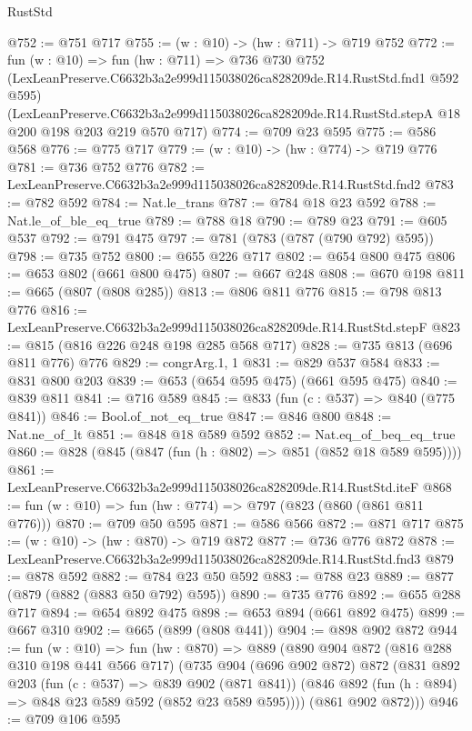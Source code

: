 \begin{lexlean}{RustStd}
\begin{coremodule}
@752 := @751 @717
@755 := (w : @10) -> (hw : @711) -> @719 @752
@772 := fun (w : @10) =>
  fun (hw : @711) =>
  @736
    @730
    @752
    (LexLeanPreserve.C6632b3a2e999d115038026ca828209de.R14.RustStd.fnd1 @592 @595)
    (LexLeanPreserve.C6632b3a2e999d115038026ca828209de.R14.RustStd.stepA
      @18
      @200
      @198
      @203
      @219
      @570
      @717)
@774 := @709 @23 @595
@775 := @586 @568
@776 := @775 @717
@779 := (w : @10) -> (hw : @774) -> @719 @776
@781 := @736 @752 @776
@782 := LexLeanPreserve.C6632b3a2e999d115038026ca828209de.R14.RustStd.fnd2
@783 := @782 @592
@784 := Nat.le_trans
@787 := @784 @18 @23 @592
@788 := Nat.le_of_ble_eq_true
@789 := @788 @18
@790 := @789 @23
@791 := @605 @537
@792 := @791 @475
@797 := @781 (@783 (@787 (@790 @792) @595))
@798 := @735 @752
@800 := @655 @226 @717
@802 := @654 @800 @475
@806 := @653 @802 (@661 @800 @475)
@807 := @667 @248
@808 := @670 @198
@811 := @665 (@807 (@808 @285))
@813 := @806 @811 @776
@815 := @798 @813 @776
@816 := LexLeanPreserve.C6632b3a2e999d115038026ca828209de.R14.RustStd.stepF
@823 := @815 (@816 @226 @248 @198 @285 @568 @717)
@828 := @735 @813 (@696 @811 @776) @776
@829 := congrArg.{1, 1}
@831 := @829 @537 @584
@833 := @831 @800 @203
@839 := @653 (@654 @595 @475) (@661 @595 @475)
@840 := @839 @811
@841 := @716 @589
@845 := @833 (fun (c : @537) => @840 (@775 @841))
@846 := Bool.of_not_eq_true
@847 := @846 @800
@848 := Nat.ne_of_lt
@851 := @848 @18 @589 @592
@852 := Nat.eq_of_beq_eq_true
@860 := @828 (@845 (@847 (fun (h : @802) => @851 (@852 @18 @589 @595))))
@861 := LexLeanPreserve.C6632b3a2e999d115038026ca828209de.R14.RustStd.iteF
@868 := fun (w : @10) => fun (hw : @774) => @797 (@823 (@860 (@861 @811 @776)))
@870 := @709 @50 @595
@871 := @586 @566
@872 := @871 @717
@875 := (w : @10) -> (hw : @870) -> @719 @872
@877 := @736 @776 @872
@878 := LexLeanPreserve.C6632b3a2e999d115038026ca828209de.R14.RustStd.fnd3
@879 := @878 @592
@882 := @784 @23 @50 @592
@883 := @788 @23
@889 := @877 (@879 (@882 (@883 @50 @792) @595))
@890 := @735 @776
@892 := @655 @288 @717
@894 := @654 @892 @475
@898 := @653 @894 (@661 @892 @475)
@899 := @667 @310
@902 := @665 (@899 (@808 @441))
@904 := @898 @902 @872
@944 := fun (w : @10) =>
  fun (hw : @870) =>
  @889
    (@890
      @904
      @872
      (@816 @288 @310 @198 @441 @566 @717)
      (@735
        @904
        (@696 @902 @872)
        @872
        (@831
          @892
          @203
          (fun (c : @537) => @839 @902 (@871 @841))
          (@846 @892 (fun (h : @894) => @848 @23 @589 @592 (@852 @23 @589 @595))))
        (@861 @902 @872)))
@946 := @709 @106 @595

\end{coremodule}
\end{lexlean}
